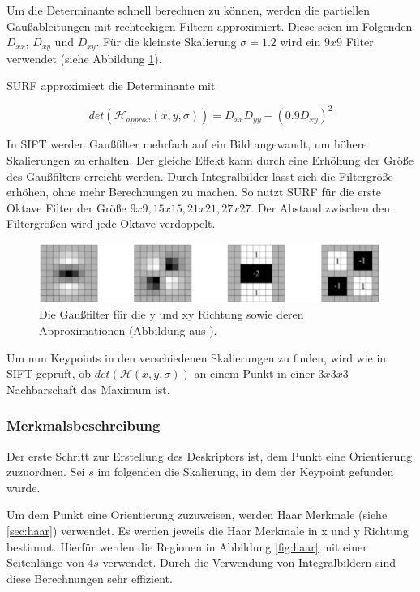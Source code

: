 Um die Determinante schnell berechnen zu können, werden die partiellen Gaußableitungen mit rechteckigen Filtern approximiert. Diese seien im Folgenden $D_{xx}$, $D_{xy}$ und $D_{xy}$. Für die kleinste Skalierung $\sigma = 1.2$ wird ein $9x9$ Filter verwendet (siehe Abbildung \ref{fig:surfBox}).

SURF approximiert die Determinante mit 

\[
det(\mathcal{H}_{approx}(x, y, \sigma)) = D_{xx}D_{yy} - (0.9 D_{xy})^2
\]

In SIFT werden Gaußfilter mehrfach auf ein Bild angewandt, um höhere Skalierungen zu erhalten.
Der gleiche Effekt kann durch eine Erhöhung der Größe des Gaußfilters erreicht werden. Durch Integralbilder lässt sich die Filtergröße erhöhen, ohne mehr Berechnungen zu machen.
So nutzt SURF für die erste Oktave Filter der Größe $9x9, 15x15, 21x21, 27x27$. Der Abstand zwischen den Filtergrößen wird jede Oktave verdoppelt.


\begin{figure}[h]
    \centering
		\includegraphics[scale=0.4]{bilder/surfBoxFilter.png}
    	\caption{Die Gaußfilter für die y und xy Richtung sowie deren Approximationen (Abbildung aus \cite{Bay:2008:SRF:1370312.1370556}).}
\label{fig:surfBox}
\end{figure} 


Um nun Keypoints in den verschiedenen Skalierungen zu finden, wird wie in SIFT geprüft, ob $det(\mathcal{H}(x, y, \sigma))$ an einem  Punkt in einer $3x3x3$ Nachbarschaft das Maximum ist.



\subsubsection{Merkmalsbeschreibung}

Der erste Schritt zur Erstellung des Deskriptors ist, dem Punkt eine Orientierung zuzuordnen. Sei $s$ im folgenden die Skalierung, in dem der Keypoint gefunden wurde.

Um dem Punkt eine Orientierung zuzuweisen, werden Haar Merkmale (siehe \ref{sec:haar}) verwendet. 
Es werden jeweils die Haar Merkmale in x und y Richtung bestimmt. Hierfür werden die Regionen in Abbildung \ref{fig:haar} mit einer Seitenlänge von $4s$ verwendet. Durch die Verwendung von Integralbildern sind diese Berechnungen sehr effizient.


